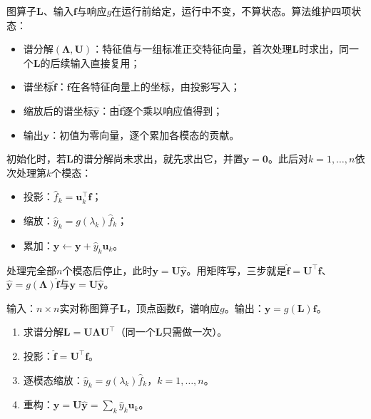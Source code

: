 图算子$\bm L$、输入$\bm f$与响应$g$在运行前给定，运行中不变，不算状态。算法维护四项状态：
\begin{itemize}
  \item 谱分解$(\bm\Lambda,\bm U)$：特征值与一组标准正交特征向量，首次处理$\bm L$时求出，同一个$\bm L$的后续输入直接复用；
  \item 谱坐标$\widehat{\bm f}$：$\bm f$在各特征向量上的坐标，由投影写入；
  \item 缩放后的谱坐标$\widehat{\bm y}$：由$\widehat{\bm f}$逐个乘以响应值得到；
  \item 输出$\bm y$：初值为零向量，逐个累加各模态的贡献。
\end{itemize}
初始化时，若$\bm L$的谱分解尚未求出，就先求出它，并置$\bm y=\bm0$。此后对$k=1,\ldots,n$依次处理第$k$个模态：
\begin{itemize}
  \item 投影：$\widehat f_k=\bm u_k^{\top}\bm f$；
  \item 缩放：$\widehat y_k=g(\lambda_k)\widehat f_k$；
  \item 累加：$\bm y\gets\bm y+\widehat y_k\bm u_k$。
\end{itemize}
处理完全部$n$个模态后停止，此时$\bm y=\bm U\widehat{\bm y}$。用矩阵写，三步就是$\widehat{\bm f}=\bm U^{\top}\bm f$、$\widehat{\bm y}=g(\bm\Lambda)\widehat{\bm f}$与$\bm y=\bm U\widehat{\bm y}$。

\begin{algorithm}[基于谱分解的图滤波]
\label{alg:graph-spec-eigendecomposition-filter}
输入：$n\times n$实对称图算子$\bm L$，顶点函数$\bm f$，谱响应$g$。输出：$\bm y=g(\bm L)\bm f$。
\begin{enumerate}
 \item 求谱分解$\bm L=\bm U\bm\Lambda\bm U^{\top}$（同一个$\bm L$只需做一次）。
 \item 投影：$\widehat{\bm f}=\bm U^{\top}\bm f$。
 \item 逐模态缩放：$\widehat y_k=g(\lambda_k)\widehat f_k$，$k=1,\ldots,n$。
 \item 重构：$\bm y=\bm U\widehat{\bm y}=\sum_k\widehat y_k\bm u_k$。
\end{enumerate}
\end{algorithm}

